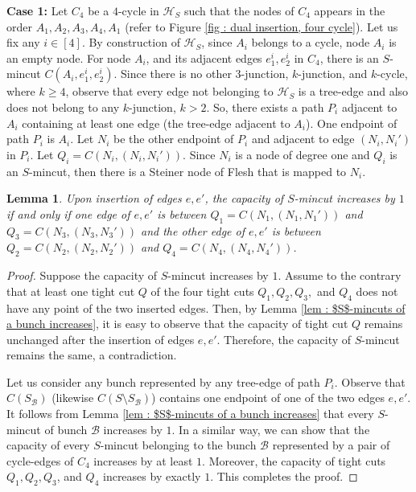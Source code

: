 \documentclass[letterpaper,11pt]{article}
\newtheorem{lemma}{Lemma}[]
\begin{document}
\noindent
\textbf{Case 1:} Let $C_4$ be a $4$-cycle in ${\mathcal H}_S$ such that the nodes of $C_4$ appears in the order $A_1,A_2,A_3,A_4,A_1$ (refer to Figure \ref{fig : dual insertion, four cycle}). Let us fix any $i\in [4]$. By construction of ${\mathcal H}_S$, since $A_i$ belongs to a cycle, node $A_i$ is an empty node. For node $A_i$, and its adjacent edges $e_1^i,e_2^i$ in $C_4$, there is an $S$-mincut $C(A_i,e_1^i,e_2^i)$. Since there is no other $3$-junction, $k$-junction, and $k$-cycle, where $k\ge 4$, observe that every edge not belonging to ${\mathcal H}_S$ is a tree-edge and also does not belong to any $k$-junction, $k>2$. So, there exists a path $P_i$ adjacent to $A_i$ containing at least one edge (the tree-edge adjacent to $A_i$). One endpoint of path $P_i$ is $A_i$. Let $N_i$ be the other endpoint of $P_i$ and adjacent to edge $(N_i,N_i')$ in $P_i$. Let $Q_i=C(N_i,(N_i,N_i'))$. Since $N_i$ is a node of degree one and $Q_i$ is an $S$-mincut, then there is a Steiner node of Flesh that is mapped to $N_i$. 
\begin{lemma} \label{lem : 4 cycle insertions}
    Upon insertion of edges $e,e'$, the capacity of $S$-mincut increases by $1$ if and only if one edge of $e,e'$ is between $Q_1=C(N_1,(N_1,N_1'))$ and $Q_3=C(N_3,(N_3,N_3'))$ and the other edge of $e,e'$ is between $Q_2=C(N_2,(N_2,N_2'))$ and $Q_4=C(N_4,(N_4,N_4'))$. 
\end{lemma}
\begin{proof}
    Suppose the capacity of $S$-mincut increases by $1$. Assume to the contrary that at least one tight cut $Q$ of the four tight cuts $Q_1,Q_2,Q_3,$ and $Q_4$ does not have any point of the two inserted edges. Then, by Lemma \ref{lem : $S$-mincuts of a bunch increases}, it is easy to observe that the capacity of tight cut $Q$ remains unchanged after the insertion of edges $e,e'$. Therefore, the capacity of $S$-mincut remains the same, a contradiction.  
    
    Let us consider any bunch represented by any tree-edge of path $P_i$. Observe that $C(S_{\mathcal B})$ (likewise $C(S\setminus S_{\mathcal B})$) contains one endpoint of one of the two edges $e,e'$. It follows from Lemma \ref{lem : $S$-mincuts of a bunch increases} that every $S$-mincut of bunch ${\mathcal B}$ increases by $1$. In a similar way, we can show that the capacity of every $S$-mincut belonging to the bunch ${\mathcal B}$ represented by a pair of cycle-edges of $C_4$ increases by at least $1$. Moreover, the capacity of tight cuts $Q_1,Q_2,Q_3$, and $Q_4$ increases by exactly $1$. This completes the proof.  
\end{proof}
\end{document}
